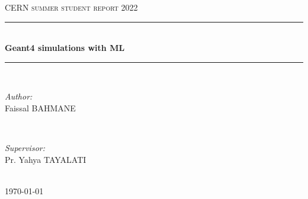\documentclass[11pt,a4paper]{report}
\author{Supervisor: Pr. Yahya Tayalati \\ Student: Faissal BAHMANE}
\begin{document}
	\begin{titlepage}

		\newcommand{\HRule}{\rule{\linewidth}{0.5mm}}
		\center
		\textsc{\LARGE CERN summer student report 2022}\\[1.5cm]

		\HRule \\[0.4cm]
		{ \huge \bfseries Geant4 simulations with ML}\\[0.4cm]
		\HRule \\[1.5cm]

		\begin{minipage}{0.4\textwidth}
			\begin{flushleft} \large
				\emph{Author:}\\
				Faissal \textsc{BAHMANE} %
			\end{flushleft}
		\end{minipage}
		~
		\begin{minipage}{0.4\textwidth}
			\begin{flushright} \large
				\emph{Supervisor:} \\
				Pr. Yahya \textsc{TAYALATI}
			\end{flushright}
		\end{minipage}\\[2cm]

		{\large \today}\\[2cm]


\end{titlepage}
\end{document}
